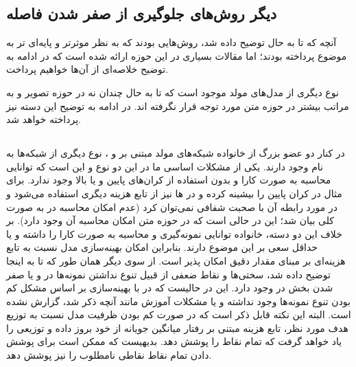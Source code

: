 \subsection{دیگر روش‌های جلوگیری از صفر شدن فاصله }
آنچه که تا به حال توضیح داده شد، روش‌هایی بودند که به نظر موثرتر و پایه‌ای تر به موضوع پرداخته بودند؛ اما مقالات بسیاری در این حوزه ارائه شده است که در ادامه به توضیح خلاصه‌ای از آن‌ها خواهیم پرداخت.

نوع دیگری از مدل‌های مولد موجود است که تا به حال چندان نه در حوزه تصویر و به مراتب بیشتر در حوزه متن مورد توجه قرار نگرفته اند. در ادامه به توضیح این دسته نیز پرداخته خواهد شد.
\subsection{\normalizingflownets{}}
در کنار دو عضو بزرگ از خانواده شبکه‌های مولد مبتنی بر \vae{} و \gan{}، نوع دیگری از شبکه‌ها به نام \normalizingflownets{} وجود دارند. یکی از مشکلات اساسی ما در این دو نوع \vae{} و \gan{} این است که توانایی محاسبه \likelihood{} به صورت کارا و بدون استفاده از کران‌های پایین و یا بالا وجود ندارد. برای مثال در \vae{} کران پایین \likelihood{} را بیشینه کرده و در \gan{}‌ها نیز از تابع هزینه دیگری استفاده می‌شود و در مورد رابطه آن با \likelihood{} صحبت شفافی نمی‌توان کرد (عدم امکان محاسبه \likelihood{} در \gan{} به صورت کلی بیان شد؛ این در حالی است که در حوزه متن امکان محاسبه آن وجود دارد).  بر خلاف این دو دسته، خانواده \normalizingflownets{} توانایی نمونه‌گیری و محاسبه \likelihood{} به صورت کارا را داشته و یا حداقل سعی بر این موضوع دارند. بنابراین امکان بهینه‌سازی مدل نسبت به تابع هزینه‌ای بر مبنای مقدار دقیق \likelihood{} امکان پذیر است. از سوی دیگر همان طور که تا به اینجا توضیح داده شد، سختی‌ها و نقاط ضعفی از قبیل تنوع نداشتن نمونه‌ها در \gan{} و یا صفر شدن بخش  در \vae{} وجود دارد. این در حالیست که در \normalizingflownets{} با بهینه‌سازی بر اساس \likelihood{} مشکل کم بودن تنوع نمونه‌ها وجود نداشته و یا مشکلات آموزش مانند آنچه ذکر شد، گزارش نشده است. البته این نکته قابل ذکر است که در صورت کم بودن ظرفیت مدل نسبت به توزیع هدف مورد نظر، تابع هزینه مبتنی بر \likelihood{} رفتار میانگین جویانه از خود بروز داده و توزیعی را یاد خواهد گرفت که تمام نقاط را پوشش دهد. بدیهیست که ممکن است برای پوشش دادن تمام نقاط نقاطی نامطلوب را نیز پوشش دهد.
